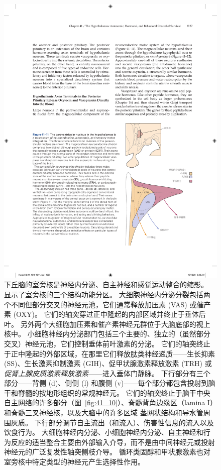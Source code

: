\begin{figure}[htbp]
	\centering
	\includegraphics[width=0.5\linewidth]{chap41/fig_41_11}
	\caption{下丘脑的室旁核是神经内分泌、自主神经和感觉运动整合的缩影。
		显示了室旁核的三个结构功能分区。
		大细胞神经内分泌分裂包括两个不同但部分交叉的神经元池，它们通常释放加压素 (VAS) 或催产素 (OXY)。
		它们的轴突穿过正中隆起的内部区域并终止于垂体后叶。
		另外两个大细胞加压素和催产素神经元群位于大脑底部的视上核中。
		小细胞神经内分泌部门包括三个主要的、独立的（虽然部分交叉）神经元池，它们控制垂体前叶激素的分泌。
		它们的轴突终止于正中隆起的外部区域，在那里它们释放肽类神经递质——生长抑素 (SS)、生长激素抑制激素 (GIH)、促甲状腺激素释放激素 (TRH) 或\textit{促肾上腺皮质激素释放激素}——进入垂体门静脉。
		下行部分有三个部分——背侧 (d)、侧侧 (l) 和腹侧 (v)——每个部分都包含投射到脑干和脊髓的按地形组织的常规神经元。
		它们的轴突终止于脑干中央自主网络的许多部分（图~\ref{fig:41_10}）、脊髓背角边缘区（lamina I）和脊髓三叉神经核，以及大脑中的许多区域 茎网状结构和导水管周围灰质。
		下行部分调节自主流出（和流入）、伤害性信息的流入以及饮食行为。
		大细胞神经内分泌、小细胞神经内分泌、自主神经和行为反应的适当整合主要由外部输入介导，而不是由中间神经元或投射神经元的广泛复发性轴突侧枝介导。
		循环类固醇和甲状腺激素也对室旁核中特定类型的神经元产生选择性作用。}
	\label{fig:41_11}
\end{figure}


